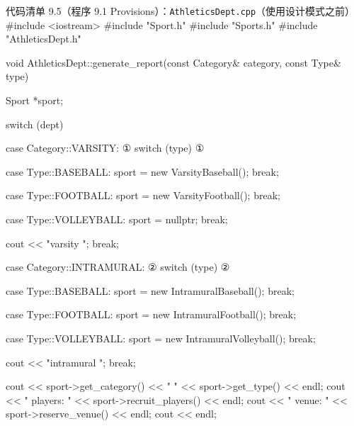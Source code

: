 \begin{codeboxt}{代码清单 9.5（程序 9.1 Provisions）：\texttt{Athletics\allowbreak{}Dept.\allowbreak{}cpp}（使用设计模式之前）}
#include <iostream>
#include "Sport.h"
#include "Sports.h"
#include "AthleticsDept.h"

void AthleticsDept::generate_report(const Category& category,
                                    const Type& type)
{
    Sport *sport;

    switch (dept)
    {
        case Category::VARSITY:      ①
            switch (type)            ①
            {
                case Type::BASEBALL:
                {
                    sport = new VarsityBaseball();
                    break;
                }

                case Type::FOOTBALL:
                {
                    sport = new VarsityFootball();
                    break;
                }

                case Type::VOLLEYBALL:
                {
                    sport = nullptr;
                    break;
                }
            }

            cout << "varsity ";
            break;

        case Category::INTRAMURAL:   ②
            switch (type)            ②
            {
                case Type::BASEBALL:
                {
                    sport = new IntramuralBaseball();
                    break;
                }

                case Type::FOOTBALL:
                {
                    sport = new IntramuralFootball();
                    break;
                }

                case Type::VOLLEYBALL:
                {
                    sport = new IntramuralVolleyball();
                    break;
                }
            }

            cout << "intramural ";
            break;
    }

    cout << sport->get_category() << " "
         << sport->get_type() << endl;
    cout << "  players: " << sport->recruit_players() << endl;
    cout << "    venue: " << sport->reserve_venue()   << endl;
    cout << endl;
}
\end{codeboxt}
\par
{}\par



